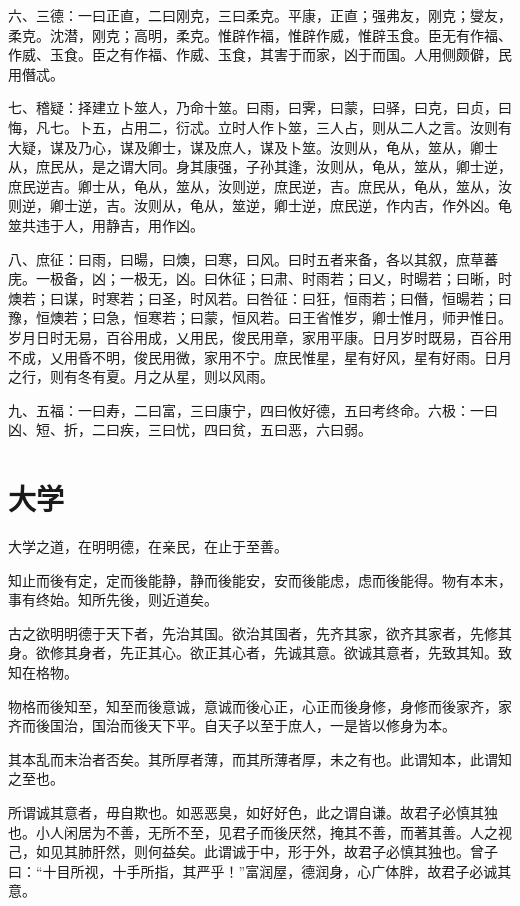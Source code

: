 六、三德：一曰正直，二曰刚克，三曰柔克。平康，正直；强弗友，刚克；燮友，柔克。沈潜，刚克；高明，柔克。惟辟作福，惟辟作威，惟辟玉食。臣无有作福、作威、玉食。臣之有作福、作威、玉食，其害于而家，凶于而国。人用侧颇僻，民用僭忒。

七、稽疑：择建立卜筮人，乃命十筮。曰雨，曰霁，曰蒙，曰驿，曰克，曰贞，曰悔，凡七。卜五，占用二，衍忒。立时人作卜筮，三人占，则从二人之言。汝则有大疑，谋及乃心，谋及卿士，谋及庶人，谋及卜筮。汝则从，龟从，筮从，卿士从，庶民从，是之谓大同。身其康强，子孙其逢，汝则从，龟从，筮从，卿士逆，庶民逆吉。卿士从，龟从，筮从，汝则逆，庶民逆，吉。庶民从，龟从，筮从，汝则逆，卿士逆，吉。汝则从，龟从，筮逆，卿士逆，庶民逆，作内吉，作外凶。龟筮共违于人，用静吉，用作凶。

八、庶征：曰雨，曰暘，曰燠，曰寒，曰风。曰时五者来备，各以其叙，庶草蕃庑。一极备，凶；一极无，凶。曰休征；曰肃、时雨若；曰乂，时暘若；曰晰，时燠若；曰谋，时寒若；曰圣，时风若。曰咎征：曰狂，恒雨若；曰僭，恒暘若；曰豫，恒燠若；曰急，恒寒若；曰蒙，恒风若。曰王省惟岁，卿士惟月，师尹惟日。岁月日时无易，百谷用成，乂用民，俊民用章，家用平康。日月岁时既易，百谷用不成，乂用昏不明，俊民用微，家用不宁。庶民惟星，星有好风，星有好雨。日月之行，则有冬有夏。月之从星，则以风雨。

九、五福：一曰寿，二曰富，三曰康宁，四曰攸好德，五曰考终命。六极：一曰凶、短、折，二曰疾，三曰忧，四曰贫，五曰恶，六曰弱。

\section{大学}

大学之道，在明明德，在亲民，在止于至善。

知止而後有定，定而後能静，静而後能安，安而後能虑，虑而後能得。物有本末，事有终始。知所先後，则近道矣。

古之欲明明德于天下者，先治其国。欲治其国者，先齐其家，欲齐其家者，先修其身。欲修其身者，先正其心。欲正其心者，先诚其意。欲诚其意者，先致其知。致知在格物。

物格而後知至，知至而後意诚，意诚而後心正，心正而後身修，身修而後家齐，家齐而後国治，国治而後天下平。自天子以至于庶人，一是皆以修身为本。

其本乱而末治者否矣。其所厚者薄，而其所薄者厚，未之有也。此谓知本，此谓知之至也。

所谓诚其意者，毋自欺也。如恶恶臭，如好好色，此之谓自谦。故君子必慎其独也。小人闲居为不善，无所不至，见君子而後厌然，掩其不善，而著其善。人之视己，如见其肺肝然，则何益矣。此谓诚于中，形于外，故君子必慎其独也。曾子曰：“十目所视，十手所指，其严乎！”富润屋，德润身，心广体胖，故君子必诚其意。


